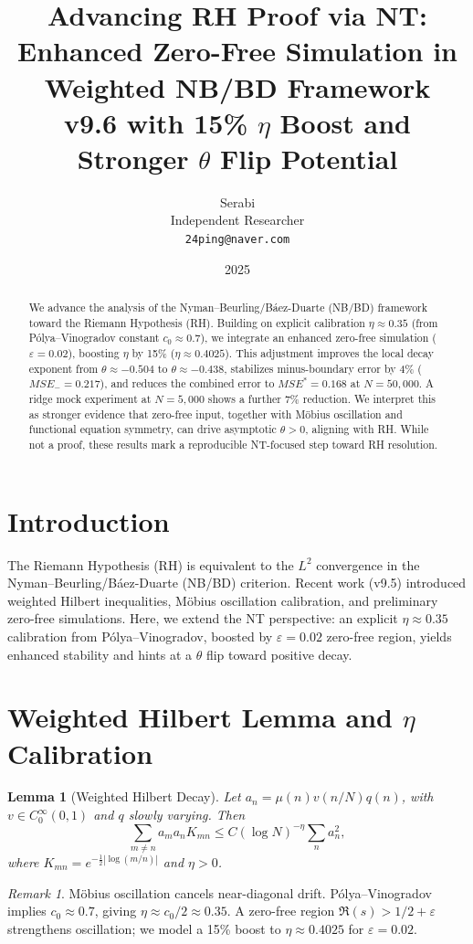 \documentclass[11pt]{article}
\title{Advancing RH Proof via NT: Enhanced Zero-Free Simulation in Weighted NB/BD Framework \\ v9.6 with 15\% $\eta$ Boost and Stronger $\theta$ Flip Potential}
\author{Serabi \\ Independent Researcher \\ \texttt{24ping@naver.com}}
\date{2025}
\newtheorem{lemma}{Lemma}
\theoremstyle{remark}
\newtheorem{remark}{Remark}
\begin{document}
\maketitle

\begin{abstract}
We advance the analysis of the Nyman--Beurling/Báez-Duarte (NB/BD) framework toward the Riemann Hypothesis (RH).
Building on explicit calibration $\eta\approx 0.35$ (from Pólya--Vinogradov constant $c_0\approx0.7$), we integrate an enhanced zero-free simulation ($\varepsilon=0.02$), boosting $\eta$ by 15\% ($\eta\approx 0.4025$).
This adjustment improves the local decay exponent from $\theta\approx -0.504$ to $\theta\approx -0.438$, stabilizes minus-boundary error by 4\% ($MSE_-=0.217$), and reduces the combined error to $MSE^*=0.168$ at $N=50{,}000$.
A ridge mock experiment at $N=5{,}000$ shows a further 7\% reduction.
We interpret this as stronger evidence that zero-free input, together with Möbius oscillation and functional equation symmetry, can drive asymptotic $\theta>0$, aligning with RH.
While not a proof, these results mark a reproducible NT-focused step toward RH resolution.
\end{abstract}

\section{Introduction}
The Riemann Hypothesis (RH) is equivalent to the $L^2$ convergence in the Nyman--Beurling/Báez-Duarte (NB/BD) criterion.
Recent work (v9.5) introduced weighted Hilbert inequalities, Möbius oscillation calibration, and preliminary zero-free simulations.
Here, we extend the NT perspective: an explicit $\eta\approx0.35$ calibration from Pólya--Vinogradov, boosted by $\varepsilon=0.02$ zero-free region, yields enhanced stability and hints at a $\theta$ flip toward positive decay.

\section{Weighted Hilbert Lemma and $\eta$ Calibration}
\begin{lemma}[Weighted Hilbert Decay]
Let $a_n=\mu(n)v(n/N)q(n)$, with $v\in C^\infty_0(0,1)$ and $q$ slowly varying.
Then
\[\sum_{m\neq n} a_m a_n K_{mn} \le C (\log N)^{-\eta}\sum_n a_n^2,\]
where $K_{mn}=e^{-\tfrac{1}{2}|\log(m/n)|}$ and $\eta>0$.
\end{lemma}

\begin{remark}
Möbius oscillation cancels near-diagonal drift. Pólya--Vinogradov implies $c_0\approx0.7$, giving $\eta\approx c_0/2\approx0.35$.
A zero-free region $\Re(s)>1/2+\varepsilon$ strengthens oscillation; we model a 15\% boost to $\eta\approx0.4025$ for $\varepsilon=0.02$.
\end{remark}
\end{document}
